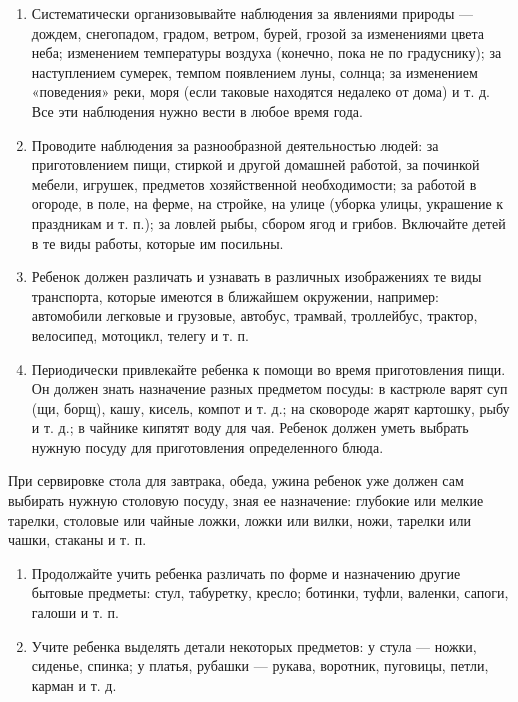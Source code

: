 \documentclass[a5paper]{book}
\begin{document}
\begin{enumerate}
\def\labelenumi{\arabic{enumi}.}
\setcounter{enumi}{1}
\item
  
  Систематически организовывайте наблюдения за явлениями природы ---
  дождем, снегопадом, градом, ветром, бурей, грозой за изменениями цвета
  неба; изменением температуры воздуха (конечно, пока не по градуснику);
  за наступлением сумерек, темпом появлением луны, солнца; за изменением
  «поведения» реки, моря (если таковые находятся недалеко от дома) и т.
  д. Все эти наблюдения нужно вести в любое время года.
  
\item
  
  Проводите наблюдения за разнообразной деятельностью людей: за
  приготовлением пищи, стиркой и другой домашней работой, за починкой
  мебели, игрушек, предметов хозяйственной необходимости; за работой в
  огороде, в поле, на ферме, на стройке, на улице (уборка улицы,
  украшение к праздникам и т. п.); за ловлей рыбы, сбором ягод и грибов.
  Включайте детей в те виды работы, которые им посильны.
  
\item
  
  Ребенок должен различать и узнавать в различных изображениях те виды
  транспорта, которые имеются в ближайшем окружении, например:
  автомобили легковые и грузовые, автобус, трамвай, троллейбус, трактор,
  велосипед, мотоцикл, телегу и т. п.
  
\item
  
  Периодически привлекайте ребенка к помощи во время приготовления пищи.
  Он должен знать назначение разных предметом посуды: в кастрюле варят
  суп (щи, борщ), кашу, кисель, компот и т. д.; на сковороде жарят
  картошку, рыбу и т. д.; в чайнике кипятят воду для чая. Ребенок должен
  уметь выбрать нужную посуду для приготовления определенного блюда.
  
\end{enumerate}


При сервировке стола для завтрака, обеда, ужина ребенок уже должен сам
выбирать нужную столовую посуду, зная ее назначение: глубокие или мелкие
тарелки, столовые или чайные ложки, ложки или вилки, ножи, тарелки или
чашки, стаканы и т. п.


\begin{enumerate}
\def\labelenumi{\arabic{enumi}.}
\setcounter{enumi}{5}
\item
  
  Продолжайте учить ребенка различать по форме и назначению другие
  бытовые предметы: стул, табуретку, кресло; ботинки, туфли, валенки,
  сапоги, галоши и т. п.
  
\item
  
  Учите ребенка выделять детали некоторых предметов: у стула --- ножки,
  сиденье, спинка; у платья, рубашки --- рукава, воротник, пуговицы,
  петли, карман и т. д.
  
\end{enumerate}
\end{document}
